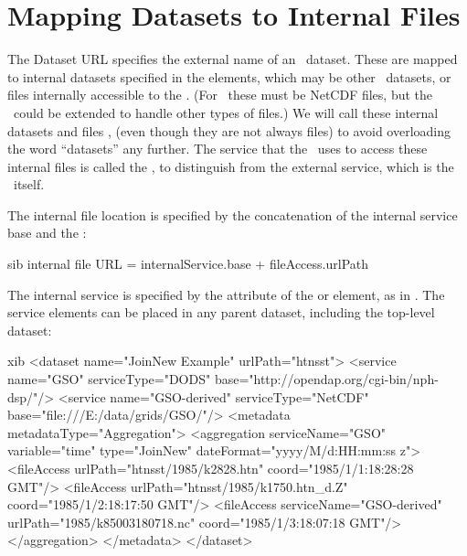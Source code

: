 \documentclass{dods-book}
\begin{document}
\section{Mapping Datasets to Internal Files}
\label{agg,mapping}

The Dataset URL specifies the external name of an \opendap\ dataset.
These are mapped to internal datasets specified in the
 elements, which may be other \opendap\ datasets, or
files internally accessible to the \aggser . (For \aggversion\ these must be
NetCDF files, but the \aggser\ could be extended to handle other types
of files.) We will call these internal datasets and files
, (even though they are not always files)
to avoid overloading the word ``datasets'' any further. The service that the
\aggser\ uses to access these internal files is called the
, to distinguish from the external
service, which is the \aggser\ itself.

The internal file location is specified by the concatenation of the
internal service base and the  :

\begin{vcode}{sib}
internal file URL = internalService.base + fileAccess.urlPath
\end{vcode}

The internal service is specified by the  attribute
of the  or  element, as in
.  The service elements can be placed in any parent
dataset, including the top-level dataset:

\begin{vcode}{xib}
<dataset name="JoinNew Example" urlPath="htnsst">
  <service name="GSO" serviceType="DODS" 
      base="http://opendap.org/cgi-bin/nph-dsp/"/>
  <service name="GSO-derived" serviceType="NetCDF" 
      base="file:///E:/data/grids/GSO/"/>
  <metadata metadataType="Aggregation">
    <aggregation serviceName="GSO" variable="time" type="JoinNew" 
        dateFormat="yyyy/M/d:HH:mm:ss z">
      <fileAccess urlPath="htnsst/1985/k2828.htn" 
          coord="1985/1/1:18:28:28 GMT"/>
      <fileAccess urlPath="htnsst/1985/k1750.htn_d.Z" 
          coord="1985/1/2:18:17:50 GMT"/>
      <fileAccess serviceName="GSO-derived" 
          urlPath="1985/k85003180718.nc" 
          coord="1985/1/3:18:07:18 GMT"/>
    </aggregation>
  </metadata>
</dataset>
\end{vcode}
\end{document}
